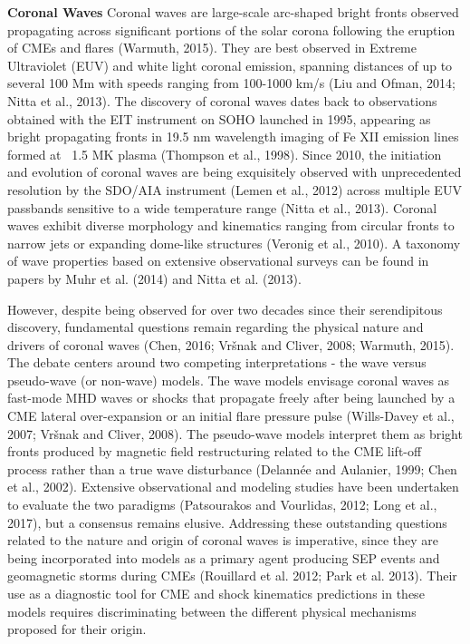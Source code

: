 \textbf{Coronal Waves}
Coronal waves are large-scale arc-shaped bright fronts observed propagating across significant portions of the solar corona following the eruption of CMEs and flares (Warmuth, 2015). They are best observed in Extreme Ultraviolet (EUV) and white light coronal emission, spanning distances of up to several 100 Mm with speeds ranging from 100-1000 km/s (Liu and Ofman, 2014; Nitta et al., 2013). The discovery of coronal waves dates back to observations obtained with the EIT instrument on SOHO launched in 1995, appearing as bright propagating fronts in 19.5 nm wavelength imaging of Fe XII emission lines formed at ~1.5 MK plasma (Thompson et al., 1998). Since 2010, the initiation and evolution of coronal waves are being exquisitely observed with unprecedented resolution by the SDO/AIA instrument (Lemen et al., 2012) across multiple EUV passbands sensitive to a wide temperature range (Nitta et al., 2013). Coronal waves exhibit diverse morphology and kinematics ranging from circular fronts to narrow jets or expanding dome-like structures (Veronig et al., 2010). A taxonomy of wave properties based on extensive observational surveys can be found in papers by Muhr et al. (2014) and Nitta et al. (2013).

However, despite being observed for over two decades since their serendipitous discovery, fundamental questions remain regarding the physical nature and drivers of coronal waves (Chen, 2016; Vršnak and Cliver, 2008; Warmuth, 2015). The debate centers around two competing interpretations - the wave versus pseudo-wave (or non-wave) models. The wave models envisage coronal waves as fast-mode MHD waves or shocks that propagate freely after being launched by a CME lateral over-expansion or an initial flare pressure pulse (Wills-Davey et al., 2007; Vršnak and Cliver, 2008). The pseudo-wave models interpret them as bright fronts produced by magnetic field restructuring related to the CME lift-off process rather than a true wave disturbance (Delannée and Aulanier, 1999; Chen et al., 2002). Extensive observational and modeling studies have been undertaken to evaluate the two paradigms (Patsourakos and Vourlidas, 2012; Long et al., 2017), but a consensus remains elusive. Addressing these outstanding questions related to the nature and origin of coronal waves is imperative, since they are being incorporated into models as a primary agent producing SEP events and geomagnetic storms during CMEs (Rouillard et al. 2012; Park et al. 2013). Their use as a diagnostic tool for CME and shock kinematics predictions in these models requires discriminating between the different physical mechanisms proposed for their origin.

